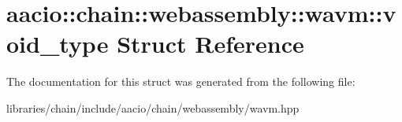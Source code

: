 \hypertarget{structaacio_1_1chain_1_1webassembly_1_1wavm_1_1void__type}{}\section{aacio\+:\+:chain\+:\+:webassembly\+:\+:wavm\+:\+:void\+\_\+type Struct Reference}
\label{structaacio_1_1chain_1_1webassembly_1_1wavm_1_1void__type}


The documentation for this struct was generated from the following file\+:\begin{DoxyCompactItemize}
\item 
libraries/chain/include/aacio/chain/webassembly/wavm.\+hpp\end{DoxyCompactItemize}
